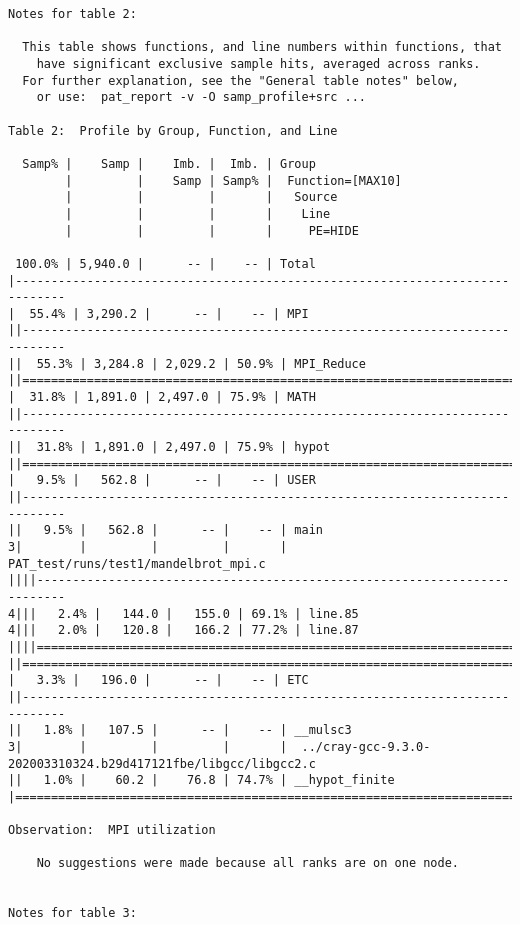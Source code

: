 \begin{verbatim}
Notes for table 2:

  This table shows functions, and line numbers within functions, that
    have significant exclusive sample hits, averaged across ranks.
  For further explanation, see the "General table notes" below,
    or use:  pat_report -v -O samp_profile+src ...

Table 2:  Profile by Group, Function, and Line

  Samp% |    Samp |    Imb. |  Imb. | Group
        |         |    Samp | Samp% |  Function=[MAX10]
        |         |         |       |   Source
        |         |         |       |    Line
        |         |         |       |     PE=HIDE
       
 100.0% | 5,940.0 |      -- |    -- | Total
|-----------------------------------------------------------------------------
|  55.4% | 3,290.2 |      -- |    -- | MPI
||----------------------------------------------------------------------------
||  55.3% | 3,284.8 | 2,029.2 | 50.9% | MPI_Reduce
||============================================================================
|  31.8% | 1,891.0 | 2,497.0 | 75.9% | MATH
||----------------------------------------------------------------------------
||  31.8% | 1,891.0 | 2,497.0 | 75.9% | hypot
||============================================================================
|   9.5% |   562.8 |      -- |    -- | USER
||----------------------------------------------------------------------------
||   9.5% |   562.8 |      -- |    -- | main
3|        |         |         |       |  PAT_test/runs/test1/mandelbrot_mpi.c
||||--------------------------------------------------------------------------
4|||   2.4% |   144.0 |   155.0 | 69.1% | line.85
4|||   2.0% |   120.8 |   166.2 | 77.2% | line.87
||||==========================================================================
||============================================================================
|   3.3% |   196.0 |      -- |    -- | ETC
||----------------------------------------------------------------------------
||   1.8% |   107.5 |      -- |    -- | __mulsc3
3|        |         |         |       |  ../cray-gcc-9.3.0-202003310324.b29d417121fbe/libgcc/libgcc2.c
||   1.0% |    60.2 |    76.8 | 74.7% | __hypot_finite
|=============================================================================

Observation:  MPI utilization

    No suggestions were made because all ranks are on one node.


Notes for table 3:


\end{verbatim}
